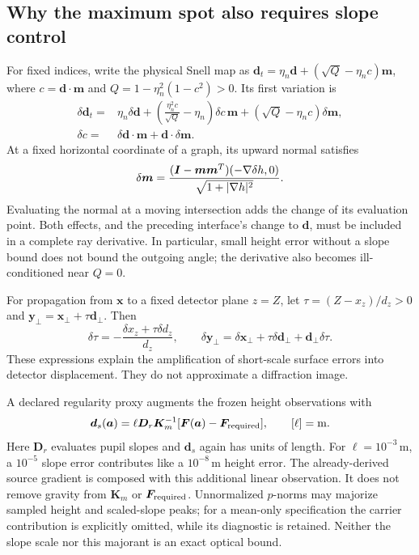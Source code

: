 \subsection{Why the maximum spot also requires slope control}
For fixed indices, write the physical Snell map as
$\bm d_t=\eta_n\bm d+(\sqrt Q-\eta_n c)\bm m$, where
$c=\bm d\cdot\bm m$ and $Q=1-\eta_n^2(1-c^2)>0$.
Its first variation is
\begin{align}
 \delta\bm d_t={}&\eta_n\delta\bm d
 +\left(\frac{\eta_n^2c}{\sqrt Q}-\eta_n\right)\delta c\,\bm m
 +(\sqrt Q-\eta_n c)\delta\bm m,\\
 \delta c={}&\delta\bm d\cdot\bm m+\bm d\cdot\delta\bm m.
\end{align}
At a fixed horizontal coordinate of a graph, its upward normal satisfies
\[
 \delta\bm m=
 \frac{(\bm I-\bm m\bm m^T)(-\nabla\delta h,0)}
 {\sqrt{1+|\nabla h|^2}}.
\]
Evaluating the normal at a moving intersection adds the change of its
evaluation point. Both effects, and the preceding interface's change to
$\bm d$, must be included in a complete ray derivative. In particular,
small height error without a slope bound does not bound the outgoing angle;
the derivative also becomes ill-conditioned near $Q=0$.

For propagation from $\bm x$ to a fixed detector plane $z=Z$, let
$\tau=(Z-x_z)/d_z>0$ and $\bm y_\perp=\bm x_\perp+\tau\bm d_\perp$.
Then
\[
 \delta\tau=-\frac{\delta x_z+\tau\delta d_z}{d_z},\qquad
 \delta\bm y_\perp=\delta\bm x_\perp+
       \tau\delta\bm d_\perp+\bm d_\perp\delta\tau.
\]
These expressions explain the amplification of short-scale surface errors
into detector displacement. They do not approximate a diffraction image.

A declared regularity proxy augments the frozen height observations with
\[
 \bm d_s(\bm a)=\ell\bm D_r\bm K_m^{-1}
       [\bm F(\bm a)-\bm F_{\rm required}],
 \qquad [\ell]=\mathrm m.
\]
Here $\bm D_r$ evaluates pupil slopes and $\bm d_s$ again has units of length.
For $\ell=10^{-3}\,\mathrm m$, a $10^{-5}$ slope error contributes like a
$10^{-8}\,\mathrm m$ height error. The already-derived source gradient is
composed with this additional linear observation. It does not remove gravity
from $\bm K_m$ or $\bm F_{\rm required}$. Unnormalized $p$-norms may majorize
sampled height and scaled-slope peaks; for a mean-only specification the
carrier contribution is explicitly omitted, while its diagnostic is retained.
Neither the slope scale nor this majorant is an exact optical bound.

